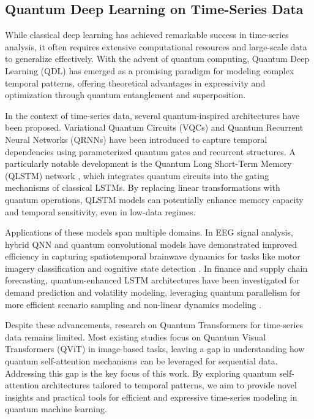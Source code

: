 \documentclass[conference]{IEEEtran}
\begin{document}
\subsection{Quantum Deep Learning on Time-Series Data}
While classical deep learning has achieved remarkable success in time-series analysis, it often requires extensive computational resources and large-scale data to generalize effectively. With the advent of quantum computing, Quantum Deep Learning (QDL) \cite{biamonte2017quantum} has emerged as a promising paradigm for modeling complex temporal patterns, offering theoretical advantages in expressivity and optimization through quantum entanglement and superposition.

In the context of time-series data, several quantum-inspired architectures have been proposed. Variational Quantum Circuits (VQCs) \cite{gohel2024quantum} and Quantum Recurrent Neural Networks (QRNNs) \cite{takaki2021learning} have been introduced to capture temporal dependencies using parameterized quantum gates and recurrent structures. A particularly notable development is the Quantum Long Short-Term Memory (QLSTM) network \cite{chen2022quantum}, which integrates quantum circuits into the gating mechanisms of classical LSTMs. By replacing linear transformations with quantum operations, QLSTM models can potentially enhance memory capacity and temporal sensitivity, even in low-data regimes.

Applications of these models span multiple domains. In EEG signal analysis, hybrid QNN and quantum convolutional models  have demonstrated improved efficiency in capturing spatiotemporal brainwave dynamics for tasks like motor imagery classification \cite{chen2024qeegnet, chen2025exploring} and cognitive state detection \cite{chen2024quantum}. In finance and supply chain forecasting, quantum-enhanced LSTM architectures have been investigated for demand prediction and volatility modeling, leveraging quantum parallelism for more efficient scenario sampling and non-linear dynamics modeling \cite{paquet2022quantumleap}.

Despite these advancements, research on Quantum Transformers for time-series data remains limited. Most existing studies focus on Quantum Visual Transformers (QViT) \cite{cherrat2022quantum, khatri2024quixer} in image-based tasks, leaving a gap in understanding how quantum self-attention mechanisms can be leveraged for sequential data. Addressing this gap is the key focus of this work. By exploring quantum self-attention architectures tailored to temporal patterns, we aim to provide novel insights and practical tools for efficient and expressive time-series modeling in quantum machine learning.
\end{document}
